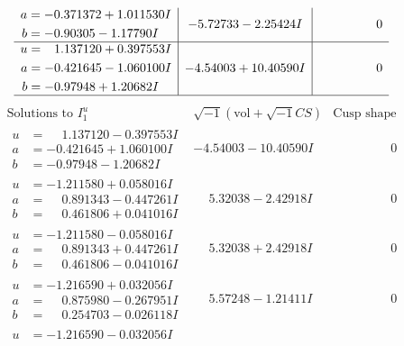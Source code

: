 \documentclass[1p]{elsarticle_modified}
\theoremstyle{definition}
\newcommand{\I}{\sqrt{-1}}
\begin{document}
$$\begin{array}{c|c|c}
\begin{aligned}
a &= -0.371372 + 1.011530 I \\
b &= -0.90305 - 1.17790 I\end{aligned}
 & -5.72733 - 2.25424 I & \phantom{-0.000000 } 0 \\ \hline\begin{aligned}
u &= \phantom{-}1.137120 + 0.397553 I \\
a &= -0.421645 - 1.060100 I \\
b &= -0.97948 + 1.20682 I\end{aligned}
 & -4.54003 + 10.40590 I & \phantom{-0.000000 } 0\\
 \hline 
 \end{array}$$\newpage$$\begin{array}{c|c|c}  
\text{Solutions to }I^u_{1}& \I (\text{vol} + \sqrt{-1}CS) & \text{Cusp shape}\\
 \hline 
\begin{aligned}
u &= \phantom{-}1.137120 - 0.397553 I \\
a &= -0.421645 + 1.060100 I \\
b &= -0.97948 - 1.20682 I\end{aligned}
 & -4.54003 - 10.40590 I & \phantom{-0.000000 } 0 \\ \hline\begin{aligned}
u &= -1.211580 + 0.058016 I \\
a &= \phantom{-}0.891343 - 0.447261 I \\
b &= \phantom{-}0.461806 + 0.041016 I\end{aligned}
 & \phantom{-}5.32038 - 2.42918 I & \phantom{-0.000000 } 0 \\ \hline\begin{aligned}
u &= -1.211580 - 0.058016 I \\
a &= \phantom{-}0.891343 + 0.447261 I \\
b &= \phantom{-}0.461806 - 0.041016 I\end{aligned}
 & \phantom{-}5.32038 + 2.42918 I & \phantom{-0.000000 } 0 \\ \hline\begin{aligned}
u &= -1.216590 + 0.032056 I \\
a &= \phantom{-}0.875980 - 0.267951 I \\
b &= \phantom{-}0.254703 - 0.026118 I\end{aligned}
 & \phantom{-}5.57248 - 1.21411 I & \phantom{-0.000000 } 0 \\ \hline\begin{aligned}
u &= -1.216590 - 0.032056 I \\

\end{aligned}
\end{array}$$
\end{document}
